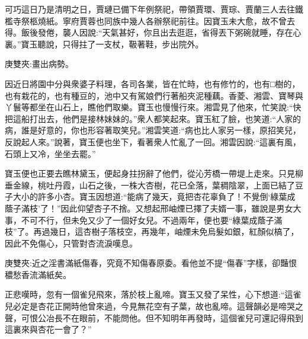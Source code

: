 \begin{parag}
    可巧這日乃是清明之日，賈璉已備下年例祭祀，帶領賈環、賈琮、賈蘭三人去往鐵檻寺祭柩燒紙。寧府賈蓉也同族中幾人各辦祭祀前往。因寶玉未大愈，故不曾去得。飯後發倦，襲人因說:“天氣甚好，你且出去逛逛，省得丟下粥碗就睡，存在心裏。”寶玉聽說，只得拄了一支杖，靸著鞋，步出院外。\begin{note}庚雙夾:畫出病勢。\end{note}因近日將園中分與衆婆子料理，各司各業，皆在忙時，也有修竹的，也有□樹的，也有栽花的，也有種豆的，池中又有駕娘們行著船夾泥種藕。香菱、湘雲、寶琴與丫鬟等都坐在山石上，瞧他們取樂。寶玉也慢慢行來。湘雲見了他來，忙笑說:“快把這船打出去，他們是接林妹妹的。”衆人都笑起來。寶玉紅了臉，也笑道:“人家的病，誰是好意的，你也形容著取笑兒。”湘雲笑道:“病也比人家另一樣，原招笑兒，反說起人來。”說著，寶玉便也坐下，看著衆人忙亂了一回。湘雲因說:“這裏有風，石頭上又冷，坐坐去罷。”
\end{parag}


\begin{parag}
    寶玉便也正要去瞧林黛玉，便起身拄拐辭了他們，從沁芳橋一帶堤上走來。只見柳垂金線，桃吐丹霞，山石之後，一株大杏樹，花已全落，葉稠陰翠，上面已結了豆子大小的許多小杏。寶玉因想道:“能病了幾天，竟把杏花辜負了！不覺倒‘綠葉成蔭子滿枝’了！”因此仰望杏子不捨。又想起邢岫煙已擇了夫婿一事，雖說是男女大事，不可不行，但未免又少了一個好女兒。不過兩年，便也要“綠葉成蔭子滿枝”了。再過幾日，這杏樹子落枝空，再幾年，岫煙未免烏髮如銀，紅顏似槁了，因此不免傷心，只管對杏流淚嘆息。\begin{note}庚雙夾:近之淫書滿紙傷春，究竟不知傷春原委。看他並不提“傷春”字樣，卻豔恨穠愁香流滿紙矣。\end{note}正悲嘆時，忽有一個雀兒飛來，落於枝上亂啼。寶玉又發了呆性，心下想道:“這雀兒必定是杏花正開時他曾來過，今見無花空有子葉，故也亂啼。這聲韻必是啼哭之聲，可恨公冶長不在眼前，不能問他。但不知明年再發時，這個雀兒可還記得飛到這裏來與杏花一會了？”
\end{parag}


